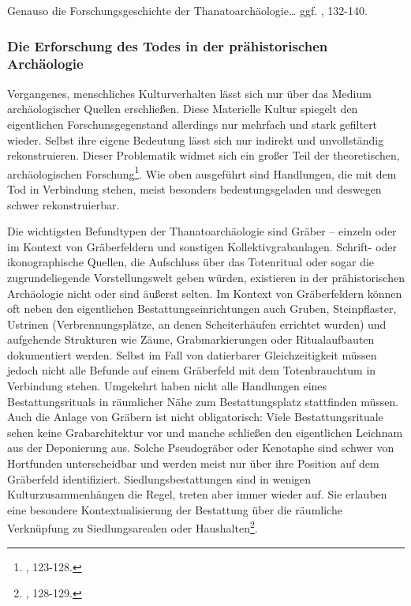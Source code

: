\documentclass[openany,twoside,twocolumn]{book}
\let\rmarkdownfootnote\footnote%
\def\footnote{\protect\rmarkdownfootnote}
\begin{document}
Genauso die Forschungsgeschichte der Thanatoarchäologie\ldots{} ggf.
\textcite{hofmann_rituelle_2008}, 132-140.

\hypertarget{die-erforschung-des-todes-in-der-prahistorischen-archaologie}{%
\subsubsection{Die Erforschung des Todes in der prähistorischen
Archäologie}\label{die-erforschung-des-todes-in-der-prahistorischen-archaologie}}

Vergangenes, menschliches Kulturverhalten lässt sich nur über das Medium
archäologischer Quellen erschließen. Diese Materielle Kultur spiegelt
den eigentlichen Forschunsgegenstand allerdings nur mehrfach und stark
gefiltert wieder. Selbst ihre eigene Bedeutung lässt sich nur indirekt
und unvollständig rekonstruieren. Dieser Problematik widmet sich ein
großer Teil der theoretischen, archäologischen Forschung\footnote{\textcite{hofmann_rituelle_2008},
  123-128.}. Wie oben ausgeführt sind Handlungen, die mit dem Tod in
Verbindung stehen, meist besonders bedeutungsgeladen und deswegen schwer
rekonstruierbar.

Die wichtigsten Befundtypen der Thanatoarchäologie sind Gräber --
einzeln oder im Kontext von Gräberfeldern und sonstigen
Kollektivgrabanlagen. Schrift- oder ikonographische Quellen, die
Aufschluss über das Totenritual oder sogar die zugrundeliegende
Vorstellungswelt geben würden, existieren in der prähistorischen
Archäologie nicht oder sind äußerst selten. Im Kontext von Gräberfeldern
können oft neben den eigentlichen Bestattungseinrichtungen auch Gruben,
Steinpflaster, Ustrinen (Verbrennungsplätze, an denen Scheiterhäufen
errichtet wurden) und aufgehende Strukturen wie Zäune, Grabmarkierungen
oder Ritualaufbauten dokumentiert werden. Selbst im Fall von datierbarer
Gleichzeitigkeit müssen jedoch nicht alle Befunde auf einem Gräberfeld
mit dem Totenbrauchtum in Verbindung stehen. Umgekehrt haben nicht alle
Handlungen eines Bestattungsrituals in räumlicher Nähe zum
Bestattungsplatz stattfinden müssen. Auch die Anlage von Gräbern ist
nicht obligatorisch: Viele Bestattungsrituale sehen keine
Grabarchitektur vor und manche schließen den eigentlichen Leichnam aus
der Deponierung aus. Solche Pseudogräber oder Kenotaphe sind schwer von
Hortfunden unterscheidbar und werden meist nur über ihre Position auf
dem Gräberfeld identifiziert. Siedlungsbestattungen sind in wenigen
Kulturzusammenhängen die Regel, treten aber immer wieder auf. Sie
erlauben eine besondere Kontextualisierung der Bestattung über die
räumliche Verknüpfung zu Siedlungsarealen oder Haushalten\footnote{\textcite{hofmann_rituelle_2008},
  128-129.}.
\end{document}
